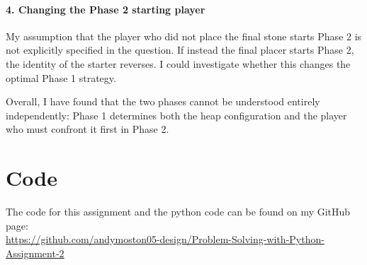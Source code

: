 \documentclass[11pt]{article}
\begin{document}
\paragraph{4. Changing the Phase 2 starting player}

My assumption that the player who did not place the final stone starts Phase 2 is not explicitly specified in the question. If instead the final placer starts Phase 2, the identity of the starter reverses. I could investigate whether this changes the optimal Phase 1 strategy.

Overall, I have found that the two phases cannot be understood entirely independently: Phase 1 determines both the heap configuration and the player who must confront it first in Phase 2.


\section{Code}
The code for this assignment and the python code can be found on my GitHub page:\\  
\url{https://github.com/andymoston05-design/Problem-Solving-with-Python-Assignment-2}
\end{document}
